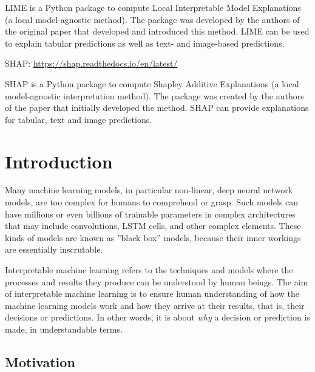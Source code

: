 LIME is a Python package to compute Local Interpretable Model Explanations (a local model-agnostic method). The package was developed by the authors of the original paper that developed and introduced this method. LIME can be used to explain tabular predictions as well as text- and image-based predictions.

\begin{tcolorbox}[colback=alert]
SHAP: \url{https://shap.readthedocs.io/en/latest/}
\end{tcolorbox}

SHAP is a Python package to compute Shapley Additive Explanations (a local model-agnostic interpretation method). The package was created by the authors of the paper that initially developed the method. SHAP can provide explanations for tabular, text and image predictions. 



\section{Introduction}

Many machine learning models, in particular non-linear, deep neural network models, are too complex for humans to comprehend or grasp. Such models can have millions or even billions of trainable parameters in complex architectures that may include convolutions, LSTM cells, and other complex elements. These kinds of models are known as ''black box'' models, because their inner workings are essentially inscrutable.

Interpretable machine learning refers to the techniques and models where the processes and results they produce can be understood by human beings. The aim of interpretable machine learning is to ensure human understanding of how the machine learning models work and how they arrive at their results, that is, their decisions or predictions. In other words, it is about \emph{why} a decision or prediction is made, in understandable terms. 

\subsection*{Motivation}

